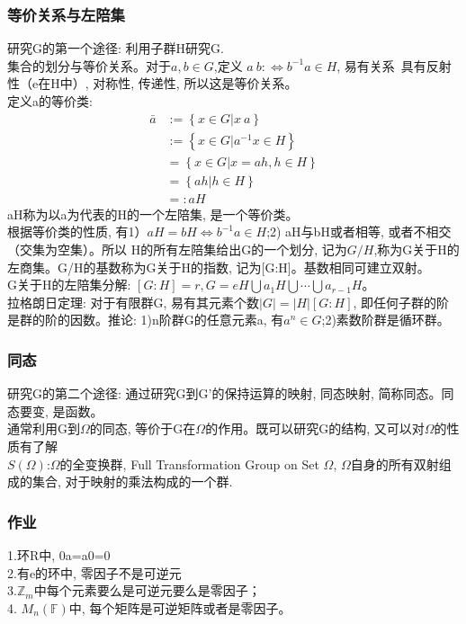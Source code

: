 \documentclass[UTF8]{../../09-Mathematics}
\begin{document}
\subsubsection{等价关系与左陪集}
研究G的第一个途径: 利用子群H研究G.\\
集合的划分与等价关系。对于$a,b \in G$,定义 $a~b:\Leftrightarrow b^{-1}a \in H$, 易有关系~具有反射性（e在H中）, 对称性, 传递性, 所以这是等价关系。\\
定义a的等价类: 
\begin{equation}
\begin{split}
\bar a  & :=\left\{ x \in G |x~a \right\}\\
        &:=\left\{ x \in G | a^{-1}x \in H \right\}\\
        &= \left\{ x\in G | x=ah,h\in H \right\}\\
        & =\left\{ ah |h \in H \right\}\\
        &=:aH
\end{split}
\end{equation}
aH称为以a为代表的H的一个左陪集, 是一个等价类。\\
根据等价类的性质, 有1）$aH=bH \Leftrightarrow b^{-1}a \in H$;2) aH与bH或者相等, 或者不相交（交集为空集）。所以 H的所有左陪集给出G的一个划分, 记为$G/H$,称为G关于H的左商集。G/H的基数称为G关于H的指数, 记为[G:H]。基数相同可建立双射。\\
G关于H的左陪集分解: $[G:H]=r, G=eH \bigcup a_1H \bigcup \cdots \bigcup a_{r-1}H$。\\
拉格朗日定理: 对于有限群G, 易有其元素个数$|G|=|H|[G:H]$, 即任何子群的阶是群的阶的因数。推论: 1)n阶群G的任意元素a, 有$a^n \in G$;2)素数阶群是循环群。

\subsubsection{同态}
研究G的第二个途径: 通过研究G到G'的保持运算的映射, 同态映射, 简称同态。同态要变, 是函数。\\
通常利用G到$\Omega$的同态, 等价于G在$\Omega$的作用。既可以研究G的结构, 又可以对$\Omega$的性质有了解\\
$S(\Omega)$:$\Omega$的全变换群, Full Transformation Group on Set $\Omega$, $\Omega$自身的所有双射组成的集合, 对于映射的乘法构成的一个群.\\

\subsubsection{作业}
1.环R中, 0a=a0=0 \\
2.有e的环中, 零因子不是可逆元\\
3.$\mathbb Z_m$中每个元素要么是可逆元要么是零因子；\\
4. $M_n(\mathbb F)$中, 每个矩阵是可逆矩阵或者是零因子。
\end{document}
